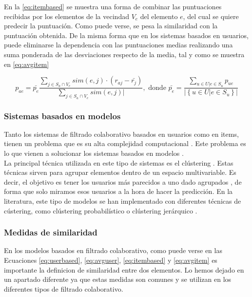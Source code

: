En la \autoref{eq:itembased} se muestra una forma de combinar las puntuaciones recibidas por los elementos de la vecindad $V_e$ del elemento $e$, del cual se quiere predecir la puntuación. Como puede verse, se pesa la similaridad con la puntuación obtenida. De la misma forma que en los sistemas basados en usuarios, puede eliminarse la dependencia con las puntuaciones medias realizando una suma ponderada de las desviaciones respecto de la media, tal y como se muestra en \autoref{eq:avgitem}

\begin{equation}
    p_{ae} = \bar{p_e} \frac{\sum_{j \in S_a \cap V_e}{sim\left(e, j\right) \cdot \left(r_{aj}-\bar{r_j}\right)}}{\sum_{j \in S_a \cap V_e}{sim\left(e, j\right)|}},\text{ donde } \bar{p_e} = \frac{\sum_{u \in U | e \in S_u}{p_{ue}}}{|\left\{u \in U | e \in S_u\right\}|}
    \label{eq:avgitem}
\end{equation}

\subsubsection{Sistemas basados en modelos}

Tanto los sistemas de filtrado colaborativo basados en usuarios como en items, tienen un problema que es su alta complejidad computacional \cite{Candiller}. Este problema es lo que vienen a solucionar los sistemas basados en modelos \cite{breese}.\\

La principal técnica utilizada en este tipo de sistemas es el clústering \cite{macqueen}. Estas técnicas sirven para agrupar elementos dentro de un espacio multivariable. Es decir, el objetivo es tener los usuarios más parecidos a uno dado agrupados \cite{oconnor}, de forma que solo miramos esos usuarios a la hora de hacer la predicción. En la literatura, este tipo de modelos se han implementado con diferentes técnicas de cústering, como clústering probabilístico \cite{pennock} o clústering jerárquico \cite{kelleher}.

\subsubsection{Medidas de similaridad}

En los modelos basados en filtrado colaborativo, como puede verse en las Ecuaciones \ref{eq:userbased}, \ref{eq:avguser}, \ref{eq:itembased} y \ref{eq:avgitem} es importante la definicion de similaridad entre dos elementos. Lo hemos dejado en un apartado diferente ya que estas medidas son comunes y se utilizan en los diferentes tipos de filtrado colaborativo.\\


